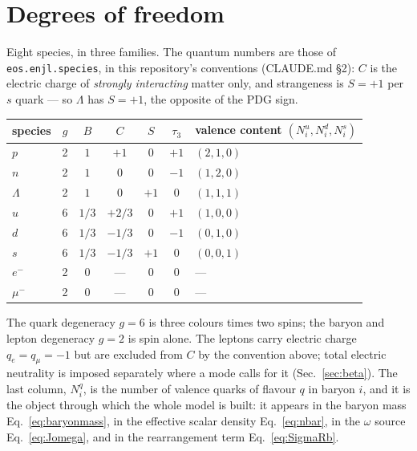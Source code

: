 \documentclass[aps,prc,onecolumn,superscriptaddress,nofootinbib,10pt]{revtex4-2}
\begin{document}
\section{Degrees of freedom}
\label{sec:dof}

Eight species, in three families. The quantum numbers are those of
\texttt{eos.enjl.species}, in this repository's conventions (CLAUDE.md
\S2): $C$ is the electric charge of \emph{strongly interacting} matter only,
and strangeness is $S = +1$ per $s$ quark --- so $\Lambda$ has $S = +1$, the
opposite of the PDG sign.

\begin{center}
\begin{tabular}{lcccccl}
\toprule
species & $g$ & $B$ & $C$ & $S$ & $\tau_3$ & valence content
                                              $(N^u_i, N^d_i, N^s_i)$ \\
\midrule
$p$       & 2 & $1$   & $+1$   & $0$  & $+1$ & $(2,1,0)$ \\
$n$       & 2 & $1$   & $0$    & $0$  & $-1$ & $(1,2,0)$ \\
$\Lambda$ & 2 & $1$   & $0$    & $+1$ & $0$  & $(1,1,1)$ \\
\midrule
$u$       & 6 & $1/3$ & $+2/3$ & $0$  & $+1$ & $(1,0,0)$ \\
$d$       & 6 & $1/3$ & $-1/3$ & $0$  & $-1$ & $(0,1,0)$ \\
$s$       & 6 & $1/3$ & $-1/3$ & $+1$ & $0$  & $(0,0,1)$ \\
\midrule
$e^-$     & 2 & $0$   & ---    & $0$  & $0$  & --- \\
$\mu^-$   & 2 & $0$   & ---    & $0$  & $0$  & --- \\
\bottomrule
\end{tabular}
\end{center}

\noindent
The quark degeneracy $g = 6$ is three colours times two spins; the baryon and
lepton degeneracy $g = 2$ is spin alone. The leptons carry electric charge
$q_e = q_\mu = -1$ but are excluded from $C$ by the convention above; total
electric neutrality is imposed separately where a mode calls for it
(Sec.~\ref{sec:beta}). The last column, $N^q_i$, is the number of valence
quarks of flavour $q$ in baryon $i$, and it is the object through which the
whole model is built: it appears in the baryon mass
Eq.~\eqref{eq:baryonmass}, in the effective scalar density
Eq.~\eqref{eq:nbar}, in the $\omega$ source Eq.~\eqref{eq:Jomega}, and in the
rearrangement term Eq.~\eqref{eq:SigmaRb}.
\end{document}
